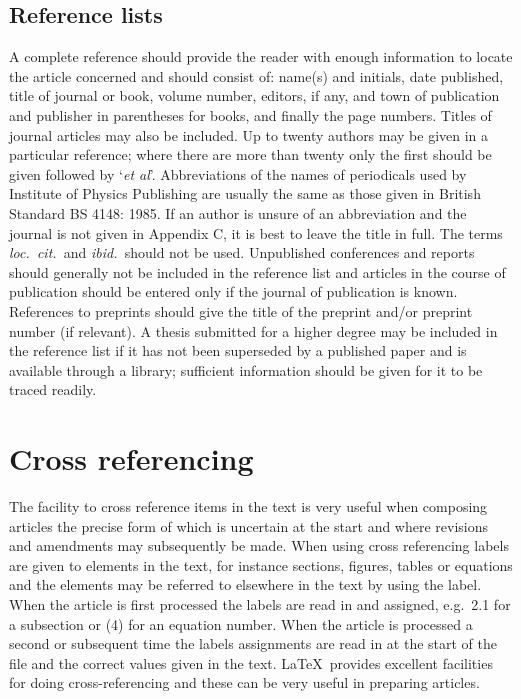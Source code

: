 \subsection{Reference lists}
A complete reference should provide the reader with enough information to
locate the article concerned and should consist of: name(s) and initials,
date published, title of journal or book, volume number, editors, if any,
and town of publication and publisher in parentheses for books,
and finally the
page numbers. Titles of journal articles may also be included.
Up to twenty authors may be given in a particular reference; where
there are more than twenty only the first should be given followed by
`{\it et al}'. Abbreviations of the names of periodicals used by Institute
of Physics Publishing are usually the same as those
given in British Standard
BS 4148: 1985. If an author is unsure of an abbreviation and the
journal is not given in Appendix C, it is best to leave the title in
full. The terms {\it loc.\ cit.\ }and {\it ibid.\ }should not be used.
Unpublished conferences and reports should generally not be included
in the reference list and articles in the course of publication should
be entered only if the journal of publication is known. References to
preprints should give the title of the preprint and/or preprint number
(if relevant). A thesis submitted for a higher degree may be included
in the reference list if it has not been superseded by a published
paper and is available through a library; sufficient information
should be given for it to be traced readily.

\section{Cross referencing\label{xrefs}}
The facility to cross reference items in the text is very useful when
composing articles the precise form of which is uncertain at the start
and where revisions and amendments may subsequently be made. When using
cross referencing labels are given to elements in the text, for
instance sections, figures, tables or equations and the elements may
be referred to elsewhere
in the text by using the label. When the article is
first processed the labels are read in and assigned, e.g.\ 2.1 for a
subsection or (4) for an equation number. When the article is
processed a second or subsequent time the labels assignments are read
in at the start of the file and the correct values given in the text.
\LaTeX\ provides excellent facilities for doing cross-referencing
and these can be very useful in preparing articles.

